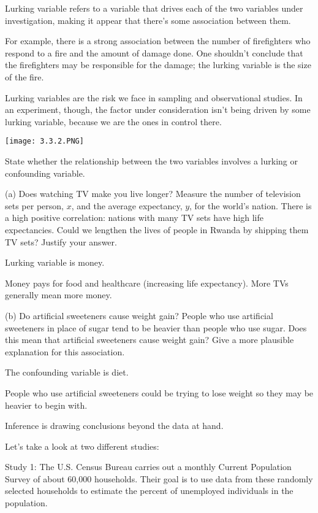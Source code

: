 \documentclass[../stats.tex]{subfiles}
\begin{document}
Lurking variable refers to a variable that drives each of the two variables under investigation, making it appear that there's some association between them.

For example, there is a strong association between the number of firefighters who respond to a fire and the amount of damage done. One shouldn't conclude that the firefighters may 
be responsible for the damage; the lurking variable is the size of the fire. 

Lurking variables are the risk we face in sampling and observational studies. In an experiment, though, the factor under consideration isn't being driven by some lurking variable, because we are the ones in control there.
\begin{center}
    \texttt{[image: 3.3.2.PNG]}
\end{center}

\pagebreak
\begin{example}
    State whether the relationship between the two variables involves a lurking or confounding variable.

    (a) Does watching TV make you live longer? Measure the number of television sets per person, $x$, and the average expectancy, $y$, for the world's nation. There is a high positive correlation: nations with many TV sets have high life expectancies. Could we lengthen the lives of people in Rwanda by shipping them TV sets? Justify your answer.

    Lurking variable is money.

    Money pays for food and healthcare (increasing life expectancy). More TVs generally mean more money.

    (b) Do artificial sweeteners cause weight gain? People who use artificial sweeteners in place of sugar tend to be heavier than people who use sugar. Does this mean that artificial sweeteners cause weight gain? Give a more plausible explanation for this association.

    The confounding variable is diet.

    People who use artificial sweeteners could be trying to lose weight so they may be heavier to begin with.
\end{example}

Inference is drawing conclusions beyond the data at hand.

Let's take a look at two different studies:

Study 1: The U.S. Census Bureau carries out a monthly Current Population Survey of about 60,000 households. Their goal is to use data from these randomly selected households to estimate the percent of unemployed individuals in the population.
\end{document}

